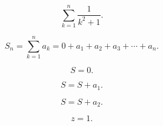 \documentclass[
	b5paper,
	11pt,
	oneside
]{scrartcl}
\begin{document}
\[ \sum_{k=1}^{n}\frac{1}{k^{2}+1}. \]

\[ S_{n}=\sum_{k=1}^{n}a_{k}=0+a_{1}+a_{2}+a_{3}+\cdots+a_{n}. \]

\[ S=0. \]

\[ S=S+a_{1}. \]

\[ S=S+a_{2}. \]

\[ z=1. \]
\end{document}
